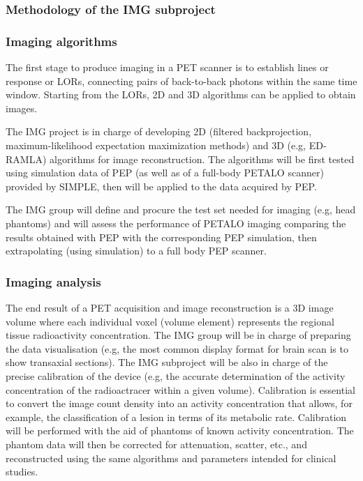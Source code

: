 \subsubsection*{Methodology of the IMG subproject}

%

\subsubsection*{Imaging algorithms}

The first stage to produce imaging in a PET scanner is to establish lines or response or LORs, connecting pairs of back-to-back photons within the same time window. Starting from the LORs, 2D and 3D algorithms can be applied to obtain images. 

The IMG project is in charge of developing 2D (filtered backprojection, maximum-likelihood expectation maximization methods) and 3D (e.g, ED-RAMLA) algorithms for image reconstruction. The algorithms will be first tested using simulation data of PEP (as well as of a full-body PETALO scanner) provided by SIMPLE, then will be applied to the data acquired by PEP. 


The IMG group will define and procure the test set needed for imaging (e.g, head phantoms) and will assess the performance of PETALO imaging comparing the results obtained with PEP with the corresponding PEP simulation, then extrapolating (using simulation) to a full body PEP scanner.  

\subsubsection*{Imaging analysis}
The end result of a PET acquisition and image reconstruction is a 3D image volume where each individual voxel (volume element) represents the regional tissue radioactivity concentration. The IMG group will be in charge of preparing the data visualisation (e.g, the most common display format for brain scan is to show transaxial sections). The IMG subproject will be also in charge of the precise calibration of the device (e.g, the accurate determination of the activity concentration of the radioactracer within a given volume). Calibration is essential to convert the image count density into an activity concentration that allows, for example, the classification of a lesion in terms of its metabolic rate. Calibration will be performed with the aid of phantoms of known activity concentration. The phantom data will then be corrected for
attenuation, scatter, etc., and reconstructed using the same algorithms and parameters intended for clinical studies. 

